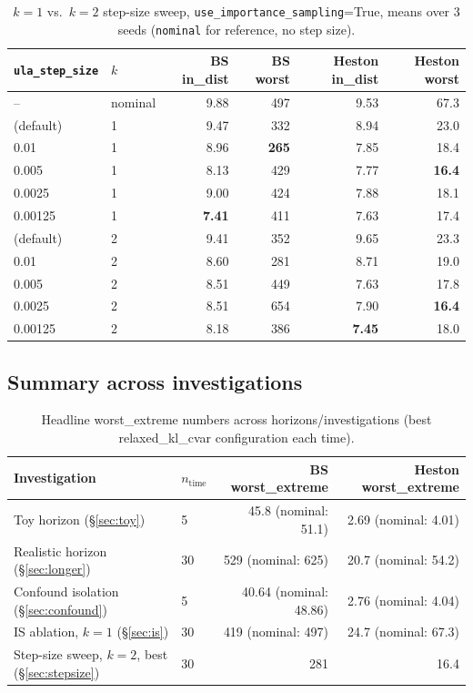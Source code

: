 \documentclass[11pt]{article}
\begin{document}
\begin{table}[h]
  \centering
  \caption{$k=1$ vs.\ $k=2$ step-size sweep, \texttt{use\_importance\_sampling}=True, means over
  3 seeds (\texttt{nominal} for reference, no step size).}
  \label{tab:stepsize-merged}
  \small
  \begin{tabular}{@{}llrrrr@{}}
    \toprule
    \texttt{ula\_step\_size} & $k$ & BS in\_dist & BS worst & Heston in\_dist & Heston worst \\
    \midrule
    -- & nominal & 9.88 & 497 & 9.53 & 67.3 \\
    \addlinespace
    0.02 (default) & 1 & 9.47 & 332 & 8.94 & 23.0 \\
    0.01           & 1 & 8.96 & \textbf{265} & 7.85 & 18.4 \\
    0.005          & 1 & 8.13 & 429 & 7.77 & \textbf{16.4} \\
    0.0025         & 1 & 9.00 & 424 & 7.88 & 18.1 \\
    0.00125        & 1 & \textbf{7.41} & 411 & 7.63 & 17.4 \\
    \addlinespace
    0.02 (default) & 2 & 9.41 & 352 & 9.65 & 23.3 \\
    0.01           & 2 & 8.60 & 281 & 8.71 & 19.0 \\
    0.005          & 2 & 8.51 & 449 & 7.63 & 17.8 \\
    0.0025         & 2 & 8.51 & 654 & 7.90 & \textbf{16.4} \\
    0.00125        & 2 & 8.18 & 386 & \textbf{7.45} & 18.0 \\
    \bottomrule
  \end{tabular}
\end{table}

\subsection{Summary across investigations}

\begin{table}[h]
  \centering
  \caption{Headline worst\_extreme numbers across horizons/investigations (best relaxed\_kl\_cvar
  configuration each time).}
  \begin{tabular}{llrr}
    \toprule
    Investigation & $n_{\mathrm{time}}$ & BS worst\_extreme & Heston worst\_extreme \\
    \midrule
    Toy horizon (\S\ref{sec:toy}) & 5 & 45.8 (nominal: 51.1) & 2.69 (nominal: 4.01) \\
    Realistic horizon (\S\ref{sec:longer}) & 30 & 529 (nominal: 625) & 20.7 (nominal: 54.2) \\
    Confound isolation (\S\ref{sec:confound}) & 5 & 40.64 (nominal: 48.86) & 2.76 (nominal: 4.04) \\
    IS ablation, $k=1$ (\S\ref{sec:is}) & 30 & 419 (nominal: 497) & 24.7 (nominal: 67.3) \\
    Step-size sweep, $k=2$, best (\S\ref{sec:stepsize}) & 30 & 281 & 16.4 \\
    \bottomrule
  \end{tabular}
\end{table}
\end{document}
